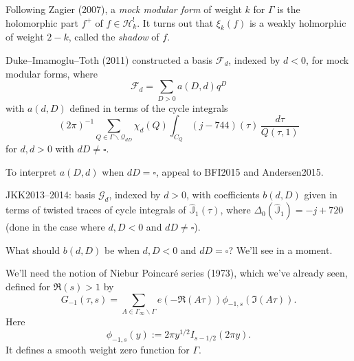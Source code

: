 \documentclass[reqno]{amsart} 
\begin{document}
Following Zagier (2007), a \emph{mock modular form} of weight $k$ for $\Gamma$ is the holomorphic part $f^+$ of $f \in \mathcal{H}_k ^!$.  It turns out that $\xi_k(f)$ is a weakly holmorphic of weight $2-k$, called the \emph{shadow} of $f$.

Duke--Imamoglu--Toth (2011) constructed a basis $\mathcal{F}_d$, indexed by $d < 0$, for mock modular forms, where
\begin{equation*}
  \mathcal{F}_d = \sum_{D > 0} a(D, d) q^D
\end{equation*}
with $a(d, D)$ defined in terms of the cycle integrals
\begin{equation*}
  (2 \pi)^{-1} \sum_{Q \in \Gamma \backslash \mathcal{Q}_{d D}}
  \chi_d(Q) \int_{C_Q}(j - 744)(\tau)
  \, \frac{d \tau}{ Q(\tau, 1)}
\end{equation*}
for $d , d > 0$ with $d D \neq \square$.

To interpret $a(D, d)$ when $d D = \square$, appeal to BFI2015 and Andersen2015.

JKK2013--2014: basis $\mathcal{G}_d$, indexed by $d > 0$, with coefficients $b(d, D)$ given in terms of twisted traces of cycle integrals of $\hat{\mathbb{J}}_1(\tau)$, where $\Delta_0(\hat{\mathbb{J}}_1) = - j + 720$ (done in the case where $d, D < 0$ and $d D \neq \square$).

What should $b(d, D)$ be when $d, D < 0$ and $d D = \square$?  We'll see in a moment.

We'll need the notion of Niebur Poincar{\'e} series (1973), which we've already seen, defined for $\Re(s) > 1$ by
\begin{equation*}
  G_{- 1}(\tau, s) = \sum_{A \in \Gamma_\infty \backslash \Gamma}
  e \left( - \Re(A \tau) \right)
  \phi_{- 1, s} \left( \Im(A \tau) \right).
\end{equation*}
Here
\begin{equation*}
  \phi_{- 1, s}(y) := 2 \pi y^{1/2} I_{s - 1/2}(2 \pi y).
\end{equation*}
It defines a smooth weight zero function for $\Gamma$.
\end{document}
